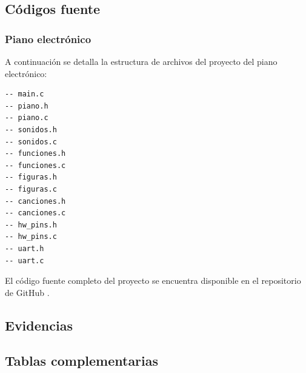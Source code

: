 \subsection{Códigos fuente}

\subsubsection{Piano electrónico}
A continuación se detalla la estructura de archivos del proyecto del piano electrónico:

\begin{verbatim}
-- main.c
-- piano.h
-- piano.c
-- sonidos.h
-- sonidos.c
-- funciones.h
-- funciones.c
-- figuras.h
-- figuras.c
-- canciones.h
-- canciones.c
-- hw_pins.h
-- hw_pins.c
-- uart.h
-- uart.c

\end{verbatim}

El código fuente completo del proyecto se encuentra disponible en el repositorio de GitHub \cite{utec_tecmicro}.

\subsection{Evidencias}

\subsection{Tablas complementarias}

